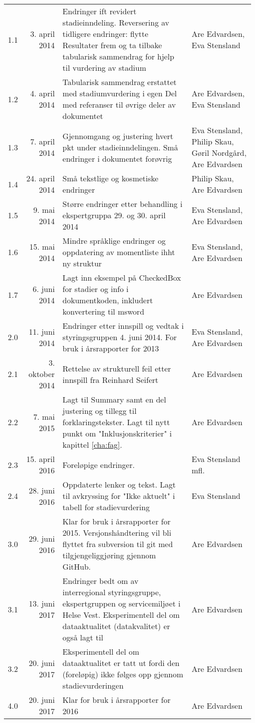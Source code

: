 \documentclass[norsk, a4paper, twocolumn]{report}
\begin{document}
\begin{longtable}{lrp{8cm}p{2.5cm}}
    1.1 & 3. april 2014 & Endringer ift revidert stadieinndeling. Reversering
    av tidligere endringer: flytte Resultater frem og ta tilbake
    tabularisk sammendrag for hjelp til vurdering av stadium & Are Edvardsen,
    Eva Stensland \\
    1.2 & 4. april 2014 & Tabularisk sammendrag erstattet med stadiumvurdering
    i egen Del med referanser til øvrige deler av dokumentet & Are Edvardsen,
    Eva Stensland \\
    1.3 & 7. april 2014 & Gjennomgang og justering hvert pkt under
    stadieinndelingen. Små endringer i dokumentet forøvrig &
    Eva Stensland, Philip Skau, Gøril Nordgård, Are Edvardsen \\
    1.4 & 24. april 2014 & Små tekstlige og kosmetiske endringer &
    Philip Skau, Are Edvardsen \\
    1.5 & 9. mai 2014 & Større endringer etter behandling i ekspertgruppa
    29. og 30. april 2014 & Eva Stensland, Are Edvardsen \\
    1.6 & 15. mai 2014 & Mindre språklige endringer og oppdatering av
    momentliste ihht ny struktur & Eva Stensland, Are Edvardsen \\
    1.7 & 6. juni 2014 & Lagt inn eksempel på CheckedBox for stadier og info
    i dokumentkoden, inkludert konvertering til msword & Are Edvardsen \\
    2.0 & 11. juni 2014 & Endringer etter innspill og vedtak i styringsgruppen
    4. juni 2014. For bruk i årsrapporter for 2013 & Eva Stensland,
    Are Edvardsen \\
    2.1 & 3. oktober 2014 & Rettelse av strukturell feil etter innspill fra
    Reinhard Seifert & Are Edvardsen \\
    2.2 & 7. mai 2015 & Lagt til Summary samt en del justering og tillegg
    til forklaringstekster. Lagt til nytt punkt om "Inklusjonskriterier" i
    kapittel \ref{cha:fag}. & Are Edvardsen \\
    2.3 & 15. april 2016 & Foreløpige endringer. & Eva Stensland mfl. \\
    2.4 & 28. juni 2016 & Oppdaterte lenker og tekst. Lagt til avkryssing
    for "Ikke aktuelt" i tabell for stadievurdering & Eva Stensland \\
    3.0 & 29. juni 2016 & Klar for bruk i årsrapporter for 2015.
    Versjonshåndtering vil bli flyttet fra subversion til git med 
    tilgjengeliggjøring gjennom GitHub. & Are Edvardsen \\
    3.1 & 13. juni 2017 & Endringer bedt om av interregional styringsgruppe,
    ekspertgruppen og servicemiljøet i Helse Vest. Eksperimentell del om
    dataaktualitet (datakvalitet) er også lagt til & Are Edvardsen \\
    3.2 & 20. juni 2017 & Eksperimentell del om dataaktualitet er tatt ut fordi
    den (foreløpig) ikke følges opp gjennom stadievurderingen & Are Edvardsen \\
    4.0 & 20. juni 2017 & Klar for bruk i årsrapporter for 2016 & Are Edvardsen 
  \label{tab:log}
\end{longtable}
\end{document}
